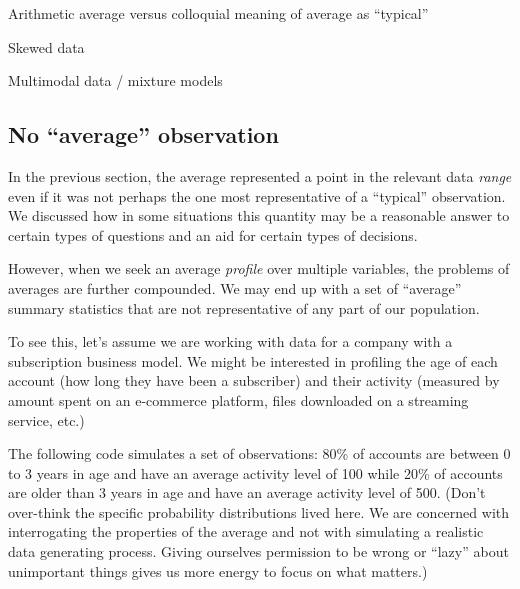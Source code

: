 \documentclass[
]{krantz}
\begin{document}
Arithmetic average versus colloquial meaning of average as ``typical''

Skewed data

Multimodal data / mixture models

\hypertarget{no-average-observation}{%
\subsection{No ``average'' observation}\label{no-average-observation}}

In the previous section, the average represented a point in the relevant data \emph{range} even if it was not perhaps the one most representative of a ``typical'' observation.
We discussed how in some situations this quantity may be a reasonable answer to certain types of questions and an aid for certain types of decisions.

However, when we seek an average \emph{profile} over multiple variables, the problems of averages are further compounded.
We may end up with a set of ``average'' summary statistics that are not representative of any part of our population.

To see this, let's assume we are working with data for a company with a subscription business model.
We might be interested in profiling the age of each account (how long they have been a subscriber) and their activity (measured by amount spent on an e-commerce platform, files downloaded on a streaming service, etc.)

The following code simulates a set of observations:
80\% of accounts are between 0 to 3 years in age and have an average activity level of 100 while 20\% of accounts are older than 3 years in age and have an average activity level of 500.
(Don't over-think the specific probability distributions lived here.
We are concerned with interrogating the properties of the average and not with simulating a realistic data generating process.
Giving ourselves permission to be wrong or ``lazy'' about unimportant things gives us more energy to focus on what matters.)
\end{document}
